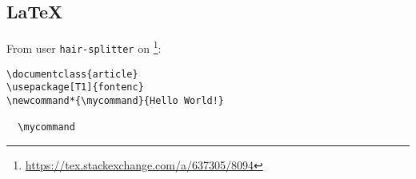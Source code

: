 \subsection{\texorpdfstring{\LaTeX}{LaTeX}}

From user \texttt{hair-splitter} on \footnote{\url{https://tex.stackexchange.com/a/637305/8094}}:

\begin{lstlisting}[style=latexstyle]
\documentclass{article}
\usepackage[T1]{fontenc}
\newcommand*{\mycommand}{Hello World!}

  \mycommand

\end{lstlisting}


